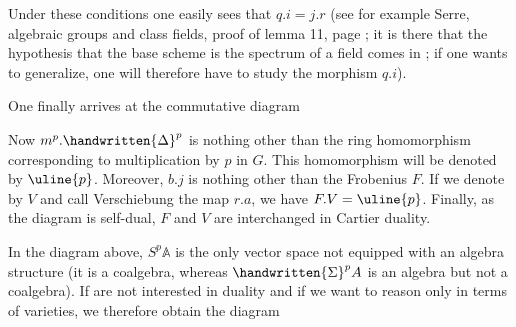 
Under these conditions one easily sees that $q.i=j.r$ (see for example Serre, algebraic groups and class fields, proof of lemma 11, page  ; it is there that the hypothesis that the base scheme is the spectrum of a field comes in ; if one wants to generalize, one will therefore have to study the morphism $q.i$).

One finally arrives at the commutative diagram

Now $m^p.\handwritten{\Delta}^{p}$ is nothing other than the ring homomorphism corresponding to multiplication by $p$ in $G$. This homomorphism will be denoted by $\uline{p}$. Moreover, $b.j$ is nothing other than the Frobenius $F$. If we denote by $V$ and call Verschiebung the map $r.a$, we have $F.V=\uline{p}$. Finally, as the diagram is self-dual, $F$ and $V$ are interchanged in Cartier duality.

In the diagram above, $S^p\mathbb{A}$ is the only vector space not equipped with an algebra structure (it is a coalgebra, whereas $\handwritten{\Sigma}^{p}A$ is an algebra but not a coalgebra). If  are not interested in duality and if we want to reason only in terms of  varieties, we therefore obtain the diagram
